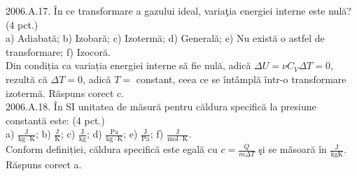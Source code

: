 2006.A.17. În ce transformare a gazului ideal, variaţia energiei interne este nulă? (4 pct.)\\ a) Adiabată; b) Izobară; c) Izotermă; d) Generală; e) Nu există o astfel de transformare; f) Izocoră.\\ Din condiția ca variația energiei interne să fie nulă, adică $\Delta U=\nu C_{V} \Delta T=0$, rezultă că $\Delta T=0$, adică $T=$ constant, ceea ce se întâmplă într-o transformare izotermă. Răspuns corect c.\\

2006.A.18. În SI unitatea de măsură pentru căldura specifică la presiune constantă este: (4 pct.)\\ a) $\frac{\mathrm{J}}{\mathrm{kg} \cdot \mathrm{K}}$; b) $\frac{\mathrm{J}}{\mathrm{K}}$; c) $\frac{\mathrm{J}}{\mathrm{kg}}$; d) $\frac{\mathrm{Pa}}{\mathrm{kg} \cdot \mathrm{K}}$; e) $\frac{\mathrm{J}}{\mathrm{Pa}}$; f) $\frac{\mathrm{J}}{\mathrm{mol} \cdot \mathrm{K}}$.\\ Conform definiției, căldura specifică este egală cu $c=\frac{Q}{m \Delta T}$ şi se măsoară în $\frac{\mathrm{J}}{\mathrm{kg} \mathrm{K}}$. Răspuns corect a.\\
